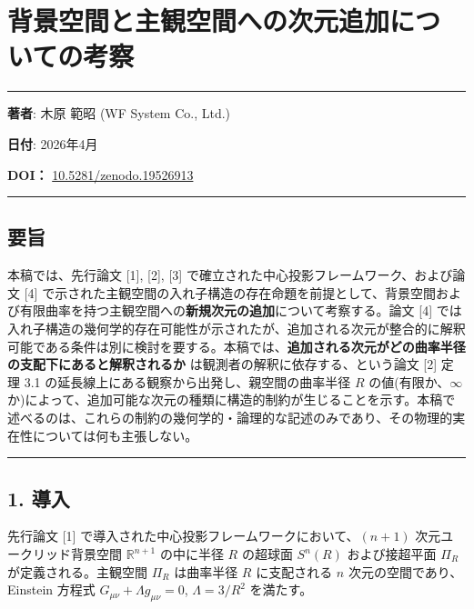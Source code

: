 \documentclass[a4paper,11pt]{ltjsarticle}
\theoremstyle{definition}
\begin{document}
\section{背景空間と主観空間への次元追加についての考察}\label{ux80ccux666fux7a7aux9593ux3068ux4e3bux89b3ux7a7aux9593ux3078ux306eux6b21ux5143ux8ffdux52a0ux306bux3064ux3044ux3066ux306eux8003ux5bdf}

\begin{center}\rule{0.5\linewidth}{0.5pt}\end{center}

\textbf{著者}: 木原 範昭 (WF System Co., Ltd.)

\textbf{日付}: 2026年4月

\textbf{DOI：} \href{https://doi.org/10.5281/zenodo.19526913}{10.5281/zenodo.19526913}

\begin{center}\rule{0.5\linewidth}{0.5pt}\end{center}

\subsection{要旨}\label{ux8981ux65e8}

本稿では、先行論文 {[}1{]}, {[}2{]}, {[}3{]} で確立された中心投影フレームワーク、および論文 {[}4{]} で示された主観空間の入れ子構造の存在命題を前提として、背景空間および有限曲率を持つ主観空間への\textbf{新規次元の追加}について考察する。論文 {[}4{]} では入れ子構造の幾何学的存在可能性が示されたが、追加される次元が整合的に解釈可能である条件は別に検討を要する。本稿では、\textbf{追加される次元がどの曲率半径の支配下にあると解釈されるか} は観測者の解釈に依存する、という論文 {[}2{]} 定理 3.1 の延長線上にある観察から出発し、親空間の曲率半径 \(R\) の値(有限か、\(\infty\) か)によって、追加可能な次元の種類に構造的制約が生じることを示す。本稿で述べるのは、これらの制約の幾何学的・論理的な記述のみであり、その物理的実在性については何も主張しない。

\begin{center}\rule{0.5\linewidth}{0.5pt}\end{center}

\subsection{1. 導入}\label{ux5c0eux5165}

先行論文 {[}1{]} で導入された中心投影フレームワークにおいて、\((n+1)\) 次元ユークリッド背景空間 \(\mathbb{R}^{n+1}\) の中に半径 \(R\) の超球面 \(S^n(R)\) および接超平面 \(\Pi_R\) が定義される。主観空間 \(\Pi_R\) は曲率半径 \(R\) に支配される \(n\) 次元の空間であり、Einstein 方程式 \(G_{\mu\nu} + \Lambda g_{\mu\nu} = 0\), \(\Lambda = 3/R^2\) を満たす。
\end{document}
